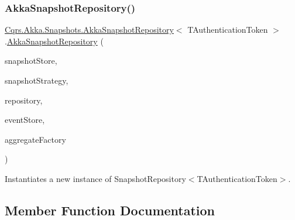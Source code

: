 \subsubsection{\texorpdfstring{Akka\+Snapshot\+Repository()}{AkkaSnapshotRepository()}}
{\footnotesize\ttfamily \hyperlink{classCqrs_1_1Akka_1_1Snapshots_1_1AkkaSnapshotRepository}{Cqrs.\+Akka.\+Snapshots.\+Akka\+Snapshot\+Repository}$<$ T\+Authentication\+Token $>$.\hyperlink{classCqrs_1_1Akka_1_1Snapshots_1_1AkkaSnapshotRepository}{Akka\+Snapshot\+Repository} (\begin{DoxyParamCaption}\item[{\hyperlink{interfaceCqrs_1_1Snapshots_1_1ISnapshotStore}{I\+Snapshot\+Store}}]{snapshot\+Store,  }\item[{\hyperlink{interfaceCqrs_1_1Snapshots_1_1ISnapshotStrategy}{I\+Snapshot\+Strategy}$<$ T\+Authentication\+Token $>$}]{snapshot\+Strategy,  }\item[{\hyperlink{interfaceCqrs_1_1Domain_1_1IAggregateRepository}{I\+Aggregate\+Repository}$<$ T\+Authentication\+Token $>$}]{repository,  }\item[{\hyperlink{interfaceCqrs_1_1Events_1_1IEventStore}{I\+Event\+Store}$<$ T\+Authentication\+Token $>$}]{event\+Store,  }\item[{\hyperlink{interfaceCqrs_1_1Domain_1_1Factories_1_1IAggregateFactory}{I\+Aggregate\+Factory}}]{aggregate\+Factory }\end{DoxyParamCaption})}



Instantiates a new instance of Snapshot\+Repository$<$\+T\+Authentication\+Token$>$. 



\subsection{Member Function Documentation}
\mbox{\label{classCqrs_1_1Akka_1_1Snapshots_1_1AkkaSnapshotRepository_a953067de4f1ed8c4528e92bf896fbf79_a953067de4f1ed8c4528e92bf896fbf79}} 
